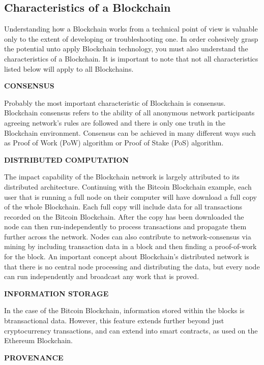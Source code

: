 \documentclass[11pt]{article}
\begin{document}
    \hypertarget{characteristics-of-a-blockchain}{%
\subsection{Characteristics of a
Blockchain}\label{characteristics-of-a-blockchain}}

    Understanding how a Blockchain works from a technical point of view is
valuable only to the extent of developing or troubleshooting one. In
order cohesively grasp the potential unto apply Blockchain technology,
you must also understand the characteristics of a Blockchain. It is
important to note that not all characteristics listed below will apply
to all Blockchains.

    \textbf{CONSENSUS}

Probably the most important characteristic of Blockchain is consensus.
Blockchain consensus refers to the ability of all anonymous network
participants agreeing network's rules are followed and there is only one
truth in the Blockchain environment. Consensus can be achieved in many
different ways such as Proof of Work (PoW) algorithm or Proof of Stake
(PoS) algorithm.

    \textbf{DISTRIBUTED COMPUTATION}

The impact capability of the Blockchain network is largely attributed to
its distributed architecture. Continuing with the Bitcoin Blockchain
example, each user that is running a full node on their computer will
have download a full copy of the whole Blockchain. Each full copy will
include data for all transactions recorded on the Bitcoin Blockchain.
After the copy has been downloaded the node can then run-independently
to process transactions and propagate them further across the network.
Nodes can also contribute to network-consensus via mining by including
transaction data in a block and then finding a proof-of-work for the
block. An important concept about Blockchain's distributed network is
that there is no central node processing and distributing the data, but
every node can run independently and broadcast any work that is proved.

    \textbf{INFORMATION STORAGE}

In the case of the Bitcoin Blockchain, information stored within the
blocks is btransactional data. However, this feature extends further
beyond just cryptocurrency transactions, and can extend into smart
contracts, as used on the Ethereum Blockchain.

    \textbf{PROVENANCE}
\end{document}

